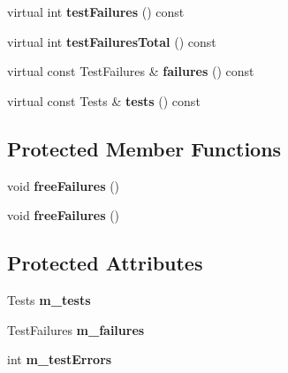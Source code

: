\begin{DoxyCompactItemize}
\item 
\hypertarget{class_test_result_collector_a583a62791337a71725a719f57dc654e2}{virtual int {\bfseries test\+Failures} () const }\label{class_test_result_collector_a583a62791337a71725a719f57dc654e2}

\item 
\hypertarget{class_test_result_collector_a73417ff24fff145f3575c3860d8e9340}{virtual int {\bfseries test\+Failures\+Total} () const }\label{class_test_result_collector_a73417ff24fff145f3575c3860d8e9340}

\item 
\hypertarget{class_test_result_collector_a9c04c7276b1b19879cc3d51e9e9f33ff}{virtual const Test\+Failures \& {\bfseries failures} () const }\label{class_test_result_collector_a9c04c7276b1b19879cc3d51e9e9f33ff}

\item 
\hypertarget{class_test_result_collector_a25890515b8eba397855a64582d3e7a9b}{virtual const Tests \& {\bfseries tests} () const }\label{class_test_result_collector_a25890515b8eba397855a64582d3e7a9b}

\end{DoxyCompactItemize}
\subsection*{Protected Member Functions}
\begin{DoxyCompactItemize}
\item 
\hypertarget{class_test_result_collector_ae3ca204ba9e242a368843e91acf94766}{void {\bfseries free\+Failures} ()}\label{class_test_result_collector_ae3ca204ba9e242a368843e91acf94766}

\item 
\hypertarget{class_test_result_collector_ae3ca204ba9e242a368843e91acf94766}{void {\bfseries free\+Failures} ()}\label{class_test_result_collector_ae3ca204ba9e242a368843e91acf94766}

\end{DoxyCompactItemize}
\subsection*{Protected Attributes}
\begin{DoxyCompactItemize}
\item 
\hypertarget{class_test_result_collector_a63950609cce95633b56850da67d4bfe0}{Tests {\bfseries m\+\_\+tests}}\label{class_test_result_collector_a63950609cce95633b56850da67d4bfe0}

\item 
\hypertarget{class_test_result_collector_ae2958ff17d1fd73092bf8ec4fc5db08f}{Test\+Failures {\bfseries m\+\_\+failures}}\label{class_test_result_collector_ae2958ff17d1fd73092bf8ec4fc5db08f}

\item 
\hypertarget{class_test_result_collector_a42fdacb6076281e8abb6eba08063fb4e}{int {\bfseries m\+\_\+test\+Errors}}\label{class_test_result_collector_a42fdacb6076281e8abb6eba08063fb4e}

\end{DoxyCompactItemize}


